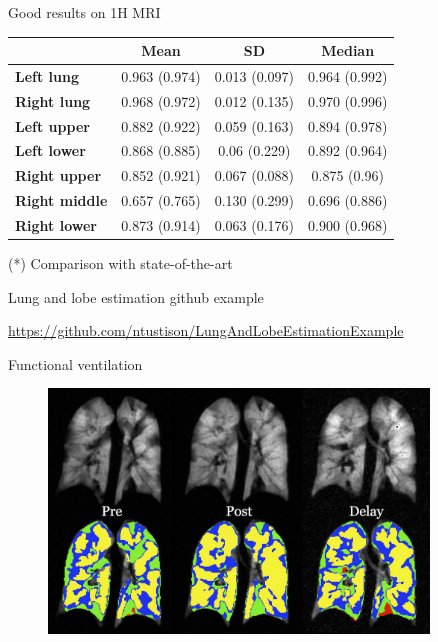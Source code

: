 \documentclass[ignorenonframetext,]{beamer}
\begin{document}
\begin{frame}{Good results on 1H MRI}

\begin{longtable}[c]{@{}lccc@{}}
\toprule
& \textbf{Mean} & \textbf{SD} & \textbf{Median}\tabularnewline
\midrule
\endhead
\textbf{Left lung} & 0.963 (0.974) & 0.013 (0.097) & 0.964
(0.992)\tabularnewline
\textbf{Right lung} & 0.968 (0.972) & 0.012 (0.135) & 0.970
(0.996)\tabularnewline
\textbf{Left upper} & 0.882 (0.922) & 0.059 (0.163) & 0.894
(0.978)\tabularnewline
\textbf{Left lower} & 0.868 (0.885) & 0.06 (0.229) & 0.892
(0.964)\tabularnewline
\textbf{Right upper} & 0.852 (0.921) & 0.067 (0.088) & 0.875
(0.96)\tabularnewline
\textbf{Right middle} & 0.657 (0.765) & 0.130 (0.299) & 0.696
(0.886)\tabularnewline
\textbf{Right lower} & 0.873 (0.914) & 0.063 (0.176) & 0.900
(0.968)\tabularnewline
\bottomrule
\end{longtable}

(*) Comparison with state-of-the-art

\end{frame}

\begin{frame}{Lung and lobe estimation github example}

\url{https://github.com/ntustison/LungAndLobeEstimationExample}

\end{frame}

\begin{frame}{Functional ventilation}

\centering

\begin{figure}
\includegraphics[width=0.9\textwidth]{./lung/figures/prePostAlbuterol.png}
\end{figure}

\end{frame}
\end{document}
